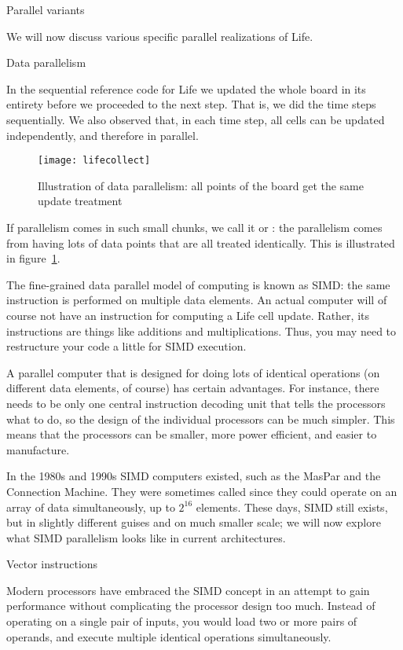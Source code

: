  {Parallel variants}

We will now discuss various specific parallel
realizations of Life.

 {Data parallelism}
\label{sec:simd}

In the sequential reference code for Life we
updated the whole board in its entirety before
we proceeded to the next step. That is, we did the time steps
sequentially. 
We also observed that, in each time step, all cells can be updated
independently, and therefore in parallel. 
\begin{figure}[t]
  \texttt{[image: lifecollect]}
  \caption{Illustration of data parallelism: all points of the board get the same update treatment}
  \label{fig:lifecollect}
\end{figure}
If parallelism comes in
such small chunks, we call it  or
: the
parallelism comes from having lots of data points that are all treated
identically. 
This is illustrated in figure~\ref{fig:lifecollect}.

The fine-grained data parallel model of computing is known as \acf{SIMD}:
the same instruction is performed on multiple data elements.
An actual computer will of course not have an instruction for computing
a Life cell update. Rather, its instructions are things like additions and multiplications.
Thus, you may need to restructure your code a little for \ac{SIMD}
execution.

A parallel computer that is designed for doing lots of identical 
operations (on different data elements, of course) has certain advantages.
For instance, there needs to be only one central 
instruction decoding unit that tells the processors what to do,
so the design of the individual processors 
can be much simpler. This means that the processors can be smaller,
more power efficient, and easier to manufacture.

In the 1980s and 1990s \ac{SIMD} computers existed, such as the MasPar
and the Connection Machine. They were sometimes called 
since they could operate on an array of data simultaneously,
up to $2^{16}$ elements.
These days, \ac{SIMD} still exists, but in slightly different guises
and on much smaller scale;
we will now explore what \ac{SIMD} parallelism looks like
in current architectures.

 {Vector instructions}
\label{sec:sse}

Modern processors have embraced the \ac{SIMD} concept in an attempt to
gain performance without complicating the processor design too much.
Instead of operating on a single pair of inputs, you would load two 
or more pairs of operands,
and execute multiple identical operations simultaneously.

